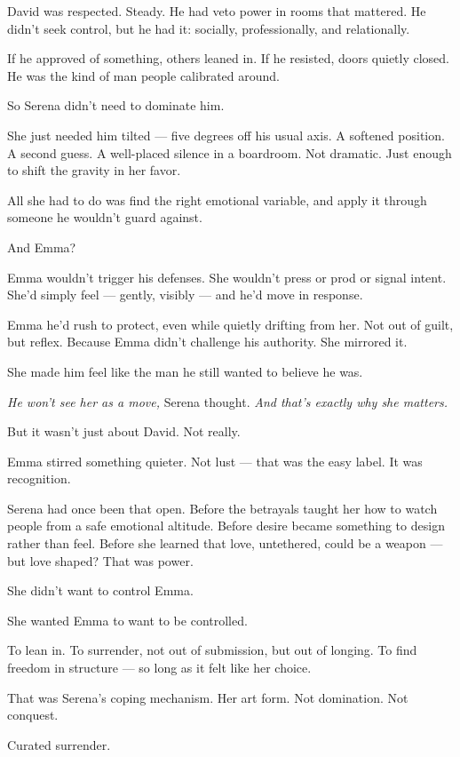 David was respected. Steady. He had veto power in rooms that mattered.
He didn’t seek control, but he had it: socially, professionally, and relationally.

If he approved of something, others leaned in.
If he resisted, doors quietly closed.
He was the kind of man people calibrated around.

So Serena didn’t need to dominate him.

She just needed him tilted — five degrees off his usual axis.
A softened position. A second guess. A well-placed silence in a boardroom.
Not dramatic. Just enough to shift the gravity in her favor.

All she had to do was find the right emotional variable,
and apply it through someone he wouldn’t guard against.

And Emma?

Emma wouldn’t trigger his defenses.
She wouldn’t press or prod or signal intent.
She’d simply feel — gently, visibly — and he’d move in response.

Emma he’d rush to protect, even while quietly drifting from her.
Not out of guilt, but reflex.
Because Emma didn’t challenge his authority.
She mirrored it.

She made him feel like the man he still wanted to believe he was.

\textit{He won’t see her as a move,} Serena thought.
\textit{And that’s exactly why she matters.}

But it wasn’t just about David.
Not really.

Emma stirred something quieter.
Not lust — that was the easy label.
It was recognition.

Serena had once been that open.
Before the betrayals taught her how to watch people from a safe emotional altitude.
Before desire became something to design rather than feel.
Before she learned that love, untethered, could be a weapon — but love shaped? That was power.

She didn’t want to control Emma.

She wanted Emma to want to be controlled.

To lean in.
To surrender, not out of submission, but out of longing.
To find freedom in structure — so long as it felt like her choice.

That was Serena’s coping mechanism. Her art form.
Not domination. Not conquest.

Curated surrender.

\medskip

